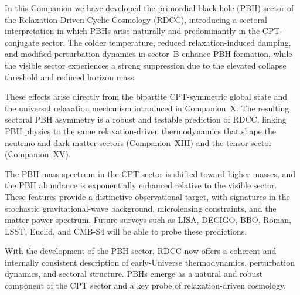 \documentclass[11pt,a4paper]{article}
\begin{document}
In this Companion we have developed the primordial black hole (PBH) sector of the
Relaxation-Driven Cyclic Cosmology (RDCC), introducing a sectoral interpretation in which
PBHs arise naturally and predominantly in the CPT-conjugate sector. The colder temperature,
reduced relaxation-induced damping, and modified perturbation dynamics in sector~B enhance
PBH formation, while the visible sector experiences a strong suppression due to the elevated
collapse threshold and reduced horizon mass.

These effects arise directly from the bipartite CPT-symmetric global state and the universal
relaxation mechanism introduced in Companion~X. The resulting sectoral PBH asymmetry is a
robust and testable prediction of RDCC, linking PBH physics to the same relaxation-driven
thermodynamics that shape the neutrino and dark matter sectors (Companion~XIII) and the
tensor sector (Companion~XV).

The PBH mass spectrum in the CPT sector is shifted toward higher masses, and the PBH
abundance is exponentially enhanced relative to the visible sector. These features provide a
distinctive observational target, with signatures in the stochastic gravitational-wave background,
microlensing constraints, and the matter power spectrum. Future surveys such as LISA, DECIGO,
BBO, Roman, LSST, Euclid, and CMB-S4 will be able to probe these predictions.

With the development of the PBH sector, RDCC now offers a coherent and internally
consistent description of early-Universe thermodynamics, perturbation dynamics, and sectoral
structure. PBHs emerge as a natural and robust component of the CPT sector and a key probe
of relaxation-driven cosmology.
\end{document}
